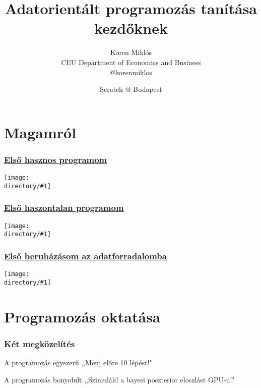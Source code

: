 \documentclass[aspectratio=169,compress,mathserif]{beamer}
\title{Adatorientált programozás tanítása kezdőknek}
\author{Koren Miklós\\
CEU Department of Economics and Business\\
@korenmiklos}
\date %
{Scratch @ Budapest}
\renewcommand{\cite}[1]{({\small #1})}
\newcommand{\directory}{./exhibits}
\newcommand{\widefigure}[2]{\begin{frame}\frametitle{\hyperlink{#1back}{#2}}\hypertarget{#1}{{\begin{center}\texttt{[image: \\directory/\#1]}\end{center}}}\end{frame}}
\begin{document}
\begin{frame}[plain]
  \titlepage
    \addtocounter{framenumber}{-1}
\end{frame}






\section{Magamról}\hypertarget{Magamról}{}
\widefigure{stencil}{Első hasznos programom}
\widefigure{keyboard.jpg}{Első haszontalan programom}
\widefigure{zipdrive}{Első beruházásom az adatforradalomba}












\section{Programozás oktatása}\hypertarget{Programozás oktatása}{}
\begin{frame}\frametitle{Két megközelítés}\hypertarget{Két megközelítés}{}
\begin{block}{A programozás egyszerű}\hypertarget{A programozás egyszerű}{}
,,Menj előre 10 lépést!"


\end{block}
\begin{block}{A programozás bonyolult}\hypertarget{A programozás bonyolult}{}
,,Szimuláld a bayesi poszterior eloszlást GPU-n!"






\end{block}
\end{frame}
\end{document}
